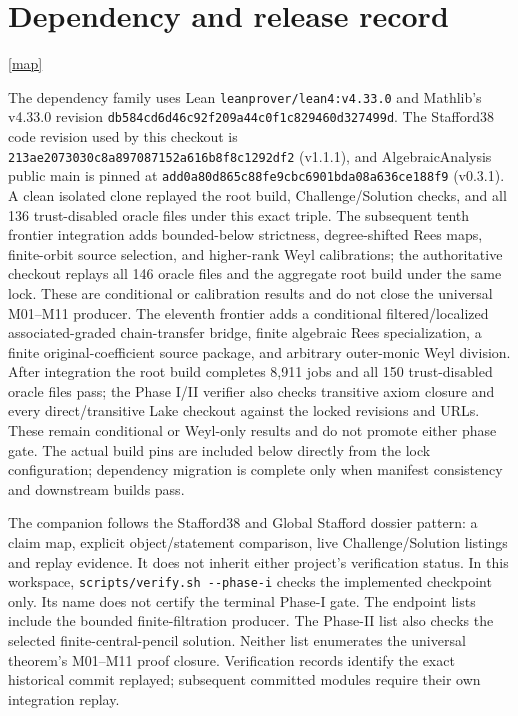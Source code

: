 \documentclass[10pt,a4paper]{article}
\newcommand{\backmap}{\hfill\hyperlink{proofmap}{[map]}}
\newcommand{\lean}[1]{\nolinkurl{#1}}
\begin{document}
\section{Dependency and release record}\label{sec:release}\backmap

The dependency family uses Lean \lean{leanprover/lean4:v4.33.0} and
Mathlib's v4.33.0 revision
\lean{db584cd6d46c92f209a44c0f1c829460d327499d}.
The Stafford38 code revision used by this checkout is
\lean{213ae2073030c8a897087152a616b8f8c1292df2} (v1.1.1), and
AlgebraicAnalysis public main is pinned at
\lean{add0a80d865c88fe9cbc6901bda08a636ce188f9} (v0.3.1). A clean isolated
clone replayed the root build, Challenge/Solution checks, and all 136
trust-disabled oracle files under this exact triple.
The subsequent tenth frontier integration adds bounded-below strictness,
degree-shifted Rees maps, finite-orbit source selection, and higher-rank Weyl
calibrations; the authoritative checkout replays all 146 oracle files and
the aggregate root build under the same lock. These are conditional or
calibration results and do not close the universal M01--M11 producer.
The eleventh frontier adds a conditional filtered/localized associated-graded
chain-transfer bridge, finite algebraic Rees specialization, a finite
original-coefficient source package, and arbitrary outer-monic Weyl division.
After integration the root build completes 8,911 jobs and all 150
trust-disabled oracle files pass; the Phase I/II verifier also checks
transitive axiom closure and every direct/transitive Lake checkout against the
locked revisions and URLs. These remain conditional or Weyl-only results and
do not promote either phase gate.
The actual build pins are included below directly from the lock configuration;
dependency migration is complete only when manifest consistency and downstream
builds pass.


The companion follows the Stafford38 and Global Stafford dossier pattern:
a claim map, explicit object/statement comparison, live Challenge/Solution
listings and replay evidence. It does not inherit either project's
verification status. In this workspace,
\lean{scripts/verify.sh --phase-i} checks the implemented checkpoint only.
Its name does not certify the terminal Phase-I gate.
The endpoint lists include the bounded finite-filtration producer.
The Phase-II list also checks the selected finite-central-pencil solution. Neither list enumerates the universal
theorem's M01--M11 proof closure. Verification records identify the exact
historical commit replayed; subsequent committed modules require their own
integration replay.
\end{document}
